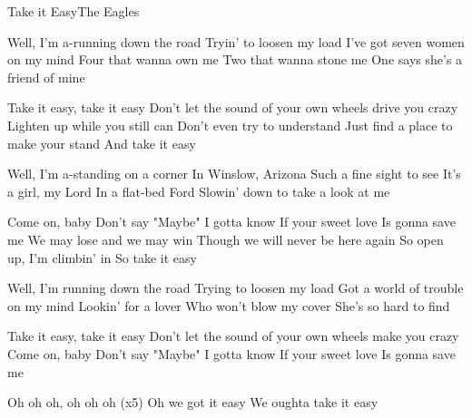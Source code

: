 \begin{Song}{Take it Easy}{The Eagles}
\begin{multicols}{2}

\begin{Verse}
Well, I'm a-running down the road
Tryin' to loosen my load
I've got seven women on my mind
Four that wanna own me
Two that wanna stone me
One says she's a friend of mine
\end{Verse}
\espaceInterStrophe

\begin{Chorus}
Take it easy, take it easy
Don't let the sound of your own wheels drive you crazy
Lighten up while you still can
Don't even try to understand
Just find a place to make your stand
And take it easy
\end{Chorus}
\espaceInterStrophe

\begin{Verse}
Well, I'm a-standing on a corner
In Winslow, Arizona
Such a fine sight to see
It's a girl, my Lord
In a flat-bed Ford
Slowin' down to take a look at me
\vfill
\columnbreak
\end{Verse}
\espaceInterStrophe

\begin{Chorus}
Come on, baby
Don't say "Maybe"
I gotta know
If your sweet love
Is gonna save me
We may lose and we may win
Though we will never be here again
So open up, I'm climbin' in
So take it easy

\end{Chorus}
\espaceInterStrophe

\begin{Verse}
Well, I'm running down the road
Trying to loosen my load
Got a world of trouble on my mind
Lookin' for a lover
Who won't blow my cover
She's so hard to find
\end{Verse}
\espaceInterStrophe

\begin{Chorus}
Take it easy, take it easy
Don't let the sound of your own wheels make you crazy
Come on, baby
Don't say "Maybe"
I gotta know
If your sweet love
Is gonna save me
\end{Chorus}
\espaceInterStrophe

\begin{Chorus}
Oh oh oh, oh oh oh (x5)
Oh we got it easy
We oughta take it easy
\end{Chorus}

\end{multicols}

\vfill


\end{Song}
